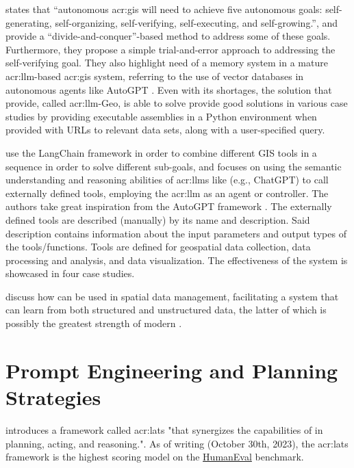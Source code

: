 \cite{liAutonomousGISNextgeneration2023} states that “autonomous \acrshort{acr:gis} will need to achieve five autonomous goals: self-generating, self-organizing, self-verifying, self-executing, and self-growing.”, and provide a “divide-and-conquer”-based method to address some of these goals. Furthermore, they propose a simple trial-and-error approach to addressing the self-verifying goal. They also highlight need of a memory system in a mature \gls{acr:llm}-based \gls{acr:gis} system, referring to the use of vector databases in autonomous agents like AutoGPT \citep{richardAutoGPTHeartOpensource2023}. Even with its shortages, the solution that \citep{liAutonomousGISNextgeneration2023} provide, called \acrshort{acr:llm}-Geo, is able to solve provide good solutions in various case studies by providing executable assemblies in a Python environment when provided with URLs to relevant data sets, along with a user-specified query.

\cite{zhangGeoGPTUnderstandingProcessing2023} use the LangChain framework \citep{chaseLangChain2022} in order to combine different GIS tools in a sequence in order to solve different sub-goals, and focuses on using the semantic understanding and reasoning abilities of \glspl{acr:llm} like (e.g., ChatGPT) to call externally defined tools, employing the \gls{acr:llm} as an agent or controller. The authors take great inspiration from the AutoGPT framework \citep{richardAutoGPTHeartOpensource2023}. The externally defined tools are described (manually) by its name and description. Said description contains information about the input parameters and output types of the tools/functions. Tools are defined for geospatial data collection, data processing and analysis, and data visualization. The effectiveness of the system is showcased in four case studies.

\cite{qiMaaSDBSpatialDatabases2023} discuss how  can be used in spatial data management, facilitating a system that can learn from both structured and unstructured data, the latter of which is possibly the greatest strength of modern .

\section{Prompt Engineering and Planning Strategies}\label{subsec:prompt-engineering-and-planning-strategies}

\cite{zhouLanguageAgentTree2023} introduces a framework called \gls{acr:lats} "that synergizes the capabilities of  in planning, acting, and reasoning.". As of writing (October 30th, 2023), the \gls{acr:lats} framework is the highest scoring model on the \hyperref[subsubsec:humaneval]{HumanEval} benchmark.

